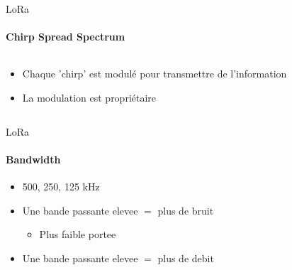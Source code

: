 \begin{frame}{LoRa}
\framesubtitle{Chirp Spread Spectrum}
\begin{columns}
  \begin{column}{0.5\textwidth}
    \begin{itemize}
      \item Chaque 'chirp' est modulé pour transmettre de l'information
      \item La modulation est propriétaire
    \end{itemize}
  \end{column}
  \begin{column}{0.5\textwidth}
    \begin{center}
    \end{center}
  \end{column}
\end{columns}
\end{frame}

\begin{frame}{LoRa}
\framesubtitle{Bandwidth}
\begin{itemize}
  \item 500, 250, 125 kHz
  \item Une bande passante elevee $=$ plus de bruit
  \begin{itemize}
    \item Plus faible portee
  \end{itemize}
  \item Une bande passante elevee $=$ plus de debit
\end{itemize}
\end{frame}

